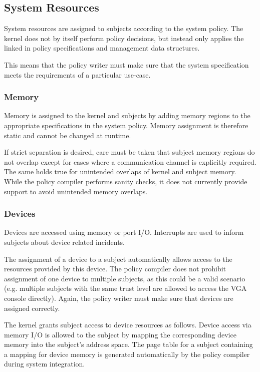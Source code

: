 \subsection{System Resources}\label{subsec:system-resources}
System resources are assigned to subjects according to the system policy. The
kernel does not by itself perform policy decisions, but instead only applies
the linked in policy specifications and management data structures.

This means that the policy writer must make sure that the system specification
meets the requirements of a particular use-case.

\subsubsection{Memory}
Memory is assigned to the kernel and subjects by adding memory regions to the
appropriate specifications in the system policy. Memory assignment is therefore
static and cannot be changed at runtime.

If strict separation is desired, care must be taken that subject memory regions
do not overlap except for cases where a communication channel is explicitly
required. The same holds true for unintended overlaps of kernel and subject
memory.  While the policy compiler performs sanity checks, it does not currently
provide support to avoid unintended memory overlaps.

\subsubsection{Devices}
Devices are accessed using memory or port I/O. Interrupts are used to inform
subjects about device related incidents.

The assignment of a device to a subject automatically allows access to the
resources provided by this device. The policy compiler does not prohibit
assignment of one device to multiple subjects, as this could be a valid scenario
(e.g.  multiple subjects with the same trust level are allowed to access the VGA
console directly). Again, the policy writer must make sure that devices are
assigned correctly.

The kernel grants subject access to device resources as follows. Device access
via memory I/O is allowed to the subject by mapping the corresponding device
memory into the subject's address space. The page table for a subject containing
a mapping for device memory is generated automatically by the policy compiler
during system integration.

